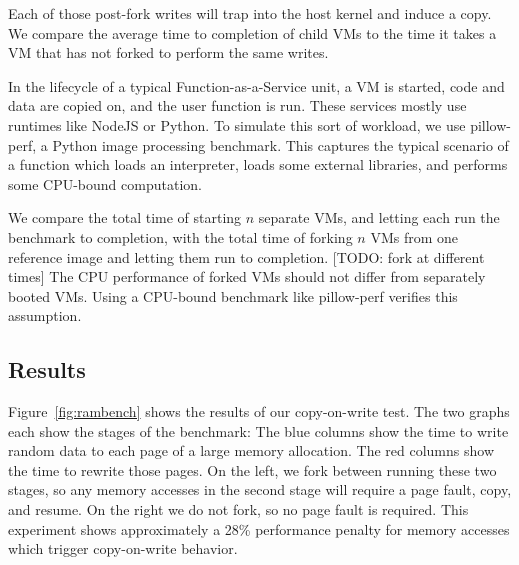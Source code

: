 Each of those post-fork writes will trap into the host kernel and induce a
copy. We compare the average time to completion of child VMs to the time it
takes a VM that has not forked to perform the same writes.

In the lifecycle of a typical Function-as-a-Service unit, a VM is started, code
and data are copied on, and the user function is run. These services mostly use
runtimes like NodeJS or Python. To simulate this sort of workload, we use
pillow-perf, a Python image processing benchmark. This captures the typical
scenario of a function which loads an interpreter, loads some external
libraries, and performs some CPU-bound computation.

We compare the total time of starting $n$ separate VMs, and letting each run
the benchmark to completion, with the total time of forking $n$ VMs from one
reference image and letting them run to completion. [TODO: fork at different
times] The CPU performance of forked VMs should not differ from separately
booted VMs. Using a CPU-bound benchmark like pillow-perf verifies this
assumption.

\subsection{Results}


Figure~\ref{fig:rambench} shows the results of our copy-on-write test. The two
graphs each show the stages of the benchmark: The blue columns show the time to
write random data to each page of a large memory allocation. The red columns
show the time to rewrite those pages. On the left, we fork between running
these two stages, so any memory accesses in the second stage will require a
page fault, copy, and resume. On the right we do not fork, so no page fault is
required. This experiment shows approximately a 28\% performance penalty for
memory accesses which trigger copy-on-write behavior.


